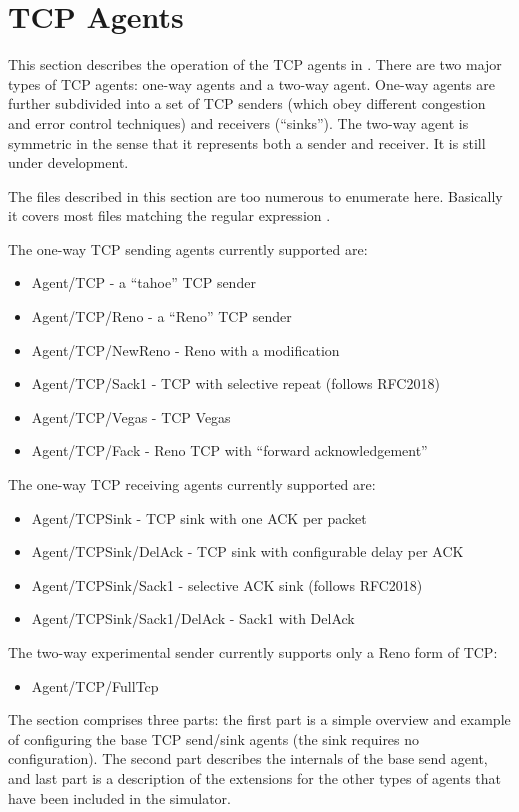 \chapter{TCP Agents}
\label{sec:tcpAgents}

This section describes the operation of the TCP agents in \ns.
There are two major types of TCP agents: one-way agents
and a two-way agent.
One-way agents are further subdivided into a set of TCP senders
(which obey different congestion and error control techniques)
and receivers (``sinks'').
The two-way agent is symmetric in the sense that it represents
both a sender and receiver.
It is still under development.

The files described in this section are too numerous to enumerate here.
Basically it covers most files matching the regular expression
.

The one-way TCP sending agents currently supported are:
\begin{itemize}\itemsep0pt
	\item Agent/TCP - a ``tahoe'' TCP sender
	\item Agent/TCP/Reno - a ``Reno'' TCP sender
	\item Agent/TCP/NewReno - Reno with a modification
	\item Agent/TCP/Sack1 - TCP with selective repeat (follows RFC2018)
	\item Agent/TCP/Vegas - TCP Vegas
	\item Agent/TCP/Fack - Reno TCP with ``forward acknowledgement''
\end{itemize}
The one-way TCP receiving agents currently supported are:
\begin{itemize}\itemsep0pt
	\item Agent/TCPSink - TCP sink with one ACK per packet
	\item Agent/TCPSink/DelAck - TCP sink with configurable delay per ACK
	\item Agent/TCPSink/Sack1 - selective ACK sink (follows RFC2018)
	\item Agent/TCPSink/Sack1/DelAck - Sack1 with DelAck
\end{itemize}
The two-way experimental sender currently supports only a Reno form of TCP:
\begin{itemize}
	\item Agent/TCP/FullTcp
\end{itemize}

The section comprises three parts:
the first part is a simple overview and example of configuring
the base TCP send/sink agents (the sink requires no configuration).
The second part describes the internals of the base send agent,
and last part is a description of the extensions
for the other types of agents that have been included in the
simulator.

